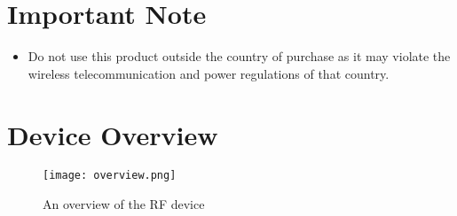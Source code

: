 
\section{Important Note} %
\label{sec:important_note}
\begin{itemize}
	\item Do not use this product outside the country of purchase as it may violate the wireless telecommunication and power regulations of that country.
\end{itemize}
\section{Device Overview} %
\label{sec:device_overview}
\begin{figure}[tbh!]
	\centering
	\texttt{[image: overview.png]}
	\caption{An overview of the RF device}
	\label{fig:overview}
\end{figure}


